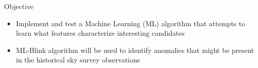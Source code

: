 \begin{frame}{Objective}
    \begin{itemize}
        \item Implement and test a Machine Learning (ML) algorithm that attempts to learn what features characterize interesting candidates
        \item ML-Blink algorithm will be used to identify anomalies that might be present in the historical sky survey observations
    \end{itemize}
\end{frame}